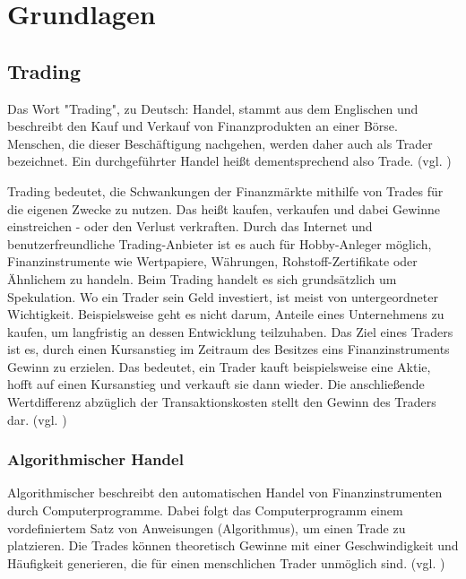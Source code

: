 \documentclass[oneside]{ausarbeitung}
\begin{document}
\chapter{Grundlagen}
\label{cha:grundlagen}

\section{Trading}
\label{sec:trading}

Das Wort "Trading", zu Deutsch: Handel, stammt aus dem Englischen und beschreibt den Kauf und Verkauf von Finanzprodukten an einer Börse. Menschen, die dieser Beschäftigung nachgehen, werden daher auch als Trader bezeichnet. Ein durchgeführter Handel heißt dementsprechend also Trade. (vgl. \cite{trading_1})

Trading bedeutet, die Schwankungen der Finanzmärkte mithilfe von Trades für die eigenen Zwecke zu nutzen. Das heißt kaufen, verkaufen und dabei Gewinne einstreichen - oder den Verlust verkraften. Durch das Internet und benutzerfreundliche Trading-Anbieter ist es auch für Hobby-Anleger möglich, Finanzinstrumente wie Wertpapiere, Währungen, Rohstoff-Zertifikate oder Ähnlichem zu handeln. Beim Trading handelt es sich grundsätzlich um Spekulation. Wo ein Trader sein Geld investiert, ist meist von untergeordneter Wichtigkeit. Beispielsweise geht es nicht darum, Anteile eines Unternehmens zu kaufen, um langfristig an dessen Entwicklung teilzuhaben. Das Ziel eines Traders ist es, durch einen Kursanstieg im Zeitraum des Besitzes eins Finanzinstruments Gewinn zu erzielen. Das bedeutet, ein Trader kauft beispielsweise eine Aktie, hofft auf einen Kursanstieg und verkauft sie dann wieder. Die anschließende Wertdifferenz abzüglich der Transaktionskosten stellt den Gewinn des Traders dar. (vgl. \cite{trading_2})

\subsection{Algorithmischer Handel}
\label{sub:algorithmischer_handel}

Algorithmischer beschreibt den automatischen Handel von Finanzinstrumenten durch Computerprogramme. Dabei folgt das Computerprogramm einem vordefiniertem Satz von Anweisungen (Algorithmus), um einen Trade zu platzieren. Die Trades können theoretisch Gewinne mit einer Geschwindigkeit und Häufigkeit generieren, die für einen menschlichen Trader unmöglich sind. (vgl. \cite{algorithmic_trading})
\end{document}
